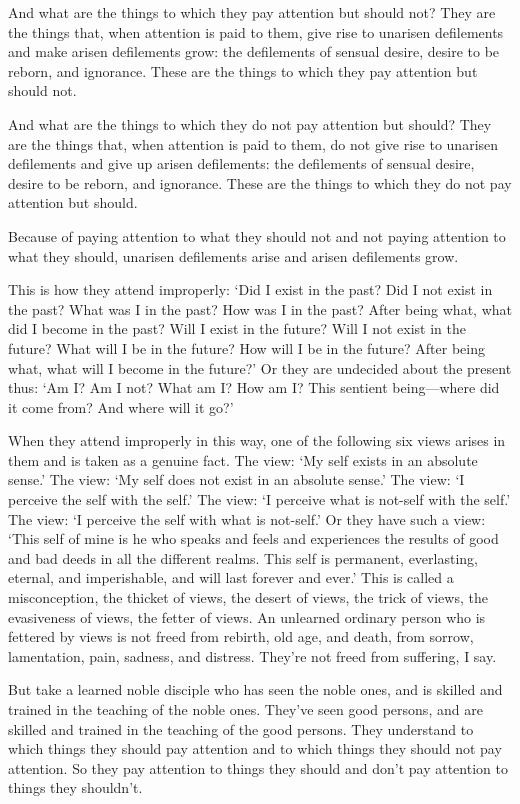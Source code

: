 \documentclass[12pt,openany]{book}%
\begin{document}
And what are the things to which they pay attention but should not? They are the things that, when attention is paid to them, give rise to unarisen defilements and make arisen defilements grow: the defilements of sensual desire, desire to be reborn, and ignorance. These are the things to which they pay attention but should not. 

And what are the things to which they do not pay attention but should? They are the things that, when attention is paid to them, do not give rise to unarisen defilements and give up arisen defilements: the defilements of sensual desire, desire to be reborn, and ignorance. These are the things to which they do not pay attention but should. 

Because of paying attention to what they should not and not paying attention to what they should, unarisen defilements arise and arisen defilements grow. 

This is how they attend improperly: ‘Did I exist in the past? Did I not exist in the past? What was I in the past? How was I in the past? After being what, what did I become in the past? Will I exist in the future? Will I not exist in the future? What will I be in the future? How will I be in the future? After being what, what will I become in the future?’ Or they are undecided about the present thus: ‘Am I? Am I not? What am I? How am I? This sentient being—where did it come from? And where will it go?’ 

When they attend improperly in this way, one of the following six views arises in them and is taken as a genuine fact. The view: ‘My self exists in an absolute sense.’ The view: ‘My self does not exist in an absolute sense.’ The view: ‘I perceive the self with the self.’ The view: ‘I perceive what is not-self with the self.’ The view: ‘I perceive the self with what is not-self.’ Or they have such a view: ‘This self of mine is he who speaks and feels and experiences the results of good and bad deeds in all the different realms. This self is permanent, everlasting, eternal, and imperishable, and will last forever and ever.’ This is called a misconception, the thicket of views, the desert of views, the trick of views, the evasiveness of views, the fetter of views. An unlearned ordinary person who is fettered by views is not freed from rebirth, old age, and death, from sorrow, lamentation, pain, sadness, and distress. They’re not freed from suffering, I say. 

But take a learned noble disciple who has seen the noble ones, and is skilled and trained in the teaching of the noble ones. They’ve seen good persons, and are skilled and trained in the teaching of the good persons. They understand to which things they should pay attention and to which things they should not pay attention. So they pay attention to things they should and don’t pay attention to things they shouldn’t. 
\end{document}
